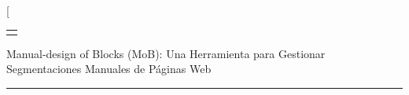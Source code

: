 \documentclass[10pt]{revecom}
\begin{document}
\newcommand*{\nextpar}{\vspace{6.0pt}} %

\twocolumn[
\begin{@twocolumnfalse}


\vspace{3pt} \noindent
\begin{tabular}{|p{508pt}|}
\hline \vspace{-0.1cm}
\parbox{508pt}{} \\
~ \vspace{0.5in} \\ \hline
\end{tabular}
\vspace{0.5cm}

\begin{center}
{\fontsize{20}{24}\selectfont
Manual-design of Blocks (MoB): Una Herramienta para Gestionar Segmentaciones Manuales de Páginas Web
}
\vspace{0.2cm}


\end{center}



\begin{center}
\noindent\rule{510pt}{0.4pt}
\end{center}
\vspace{-0.1cm}


\end{@twocolumnfalse}
\end{document}
